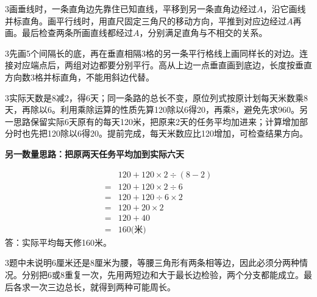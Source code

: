 \documentclass[multi=snippet,border={5bp 20bp 5bp 5bp}]{standalone}
\newenvironment{snippet}[3]{\begin{minipage}{#1bp}\color{answerred}\fontsize{#2}{#3}\selectfont\raggedright}{\end{minipage}}
\begin{document}
\begin{snippet}{505}{11.5}{14}\begin{multicols}{3}\raggedcolumns 画垂线时，一条直角边先靠住已知直线，平移到另一条直角边经过\(A\)\allowbreak ，沿它画线并标直角。画平行线时，用直尺固定三角尺的移动方向，平推到对应边经过\(A\)\allowbreak 再画。最后检查两条所画直线都经过\(A\)\allowbreak ，分别满足直角与不相交的关系。\end{multicols}\end{snippet}
\begin{snippet}{505}{11.5}{14}\begin{multicols}{3}\raggedcolumns 先画5个间隔长的底，再在垂直相隔3格的另一条平行格线上画同样长的对边。连接对应端点后，两组对边都要分别平行。高从上边一点垂直画到底边，长度按垂直方向数3格并标直角，不能用斜边代替。\end{multicols}\end{snippet}
\begin{snippet}{505}{11.5}{14}\begin{multicols}{3}\raggedcolumns 实际天数是8减2，得6天；同一条路的总长不变，原位列式按原计划每天米数乘8天，再除以6。利用乘除运算的性质先算120除以6得20，再乘8，避免先求960。另一思路保留实际6天原有的每天120米，把原来2天的任务平均加进来；计算增加部分时也先把120除以6得20。提前完成，每天米数应比120增加，可检查结果方向。\par \textbf{另一数量思路：把原两天任务平均加到实际六天}\par \[\begin{aligned}&120+120\times2\div(8-2)\\={}&120+120\times2\div6\\={}&120+120\div6\times2\\={}&120+20\times2\\={}&120+40\\={}&160\text{(米)}\end{aligned}\]答：实际平均每天修160米。\end{multicols}\end{snippet}
\begin{snippet}{505}{11.5}{14}\begin{multicols}{3}\raggedcolumns 题中未说明6厘米还是8厘米为腰，等腰三角形有两条相等边，因此必须分两种情况。分别把6或8重复一次，先用两短边和大于最长边检验，两个分支都能成立。最后各求一次三边总长，就得到两种可能周长。\end{multicols}\end{snippet}
\end{document}
